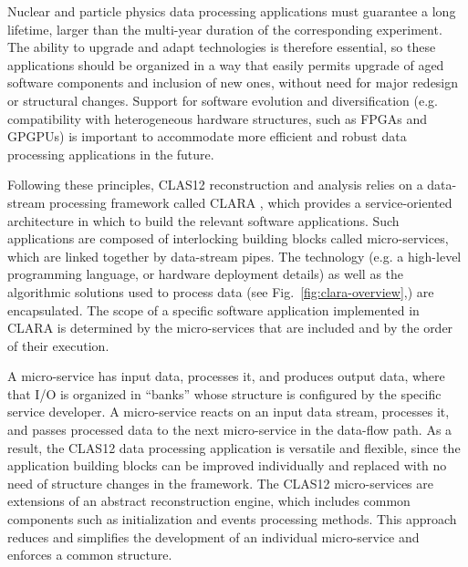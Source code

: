 Nuclear and particle physics data processing applications must guarantee a long lifetime, larger than the multi-year duration of the corresponding experiment. The ability to upgrade and adapt technologies is therefore essential, so these applications should be organized in a way that easily permits upgrade of aged software components and inclusion of new ones, without need for major redesign or structural changes.  Support for software evolution and diversification (e.g. compatibility with heterogeneous hardware structures, such as FPGAs and GPGPUs) is important to accommodate more efficient and robust data processing applications in the future.


Following these principles, CLAS12 reconstruction and analysis relies on a data-stream processing framework called CLARA \cite{clara-2011,clara-service,framework,clara-2016}, which provides a service-oriented architecture in which to build the relevant software applications.  Such applications are composed of interlocking building blocks called micro-services, which are linked together by data-stream pipes.  The technology (e.g. a high-level programming language, or hardware deployment details) as well as the algorithmic solutions used to process data (see Fig.~\ref{fig:clara-overview},) are encapsulated.
The scope of a specific software application implemented in CLARA is determined by the micro-services that are included and by the order of their execution.

A micro-service has input data, processes it, and produces output data, where that I/O is organized in ``banks'' whose structure is configured by the specific service developer.  A micro-service reacts on an input data stream, processes it, and passes processed data to the next micro-service in the data-flow path.  As a result, the CLAS12 data processing application is versatile and flexible, since the application building blocks can be improved individually and replaced with no need of structure changes in the framework. The CLAS12 micro-services are extensions of an abstract reconstruction engine, which includes common components such as initialization and events processing methods. This approach reduces and simplifies the development of an individual micro-service and enforces a common structure. 


